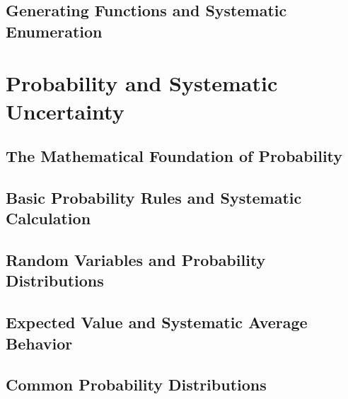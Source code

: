 \documentclass[12pt, oneside, openany]{book}
\begin{document}
\section{Generating Functions and Systematic Enumeration}


\chapter{Probability and Systematic Uncertainty}

\section{The Mathematical Foundation of Probability}

\section{Basic Probability Rules and Systematic Calculation}

\section{Random Variables and Probability Distributions}

\section{Expected Value and Systematic Average Behavior}

\section{Common Probability Distributions}
\end{document}

